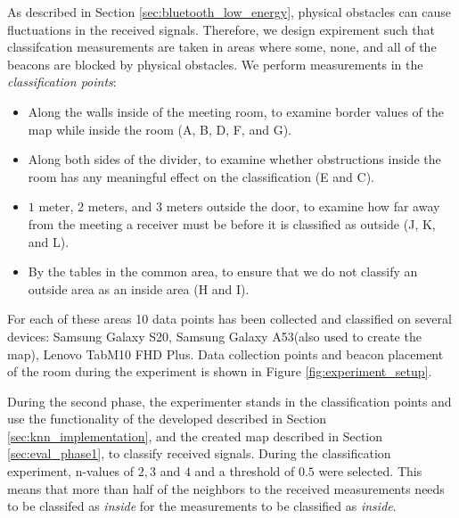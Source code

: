 As described in Section \ref{sec:bluetooth_low_energy}, physical obstacles can cause fluctuations in the received signals. 
Therefore, we design expirement such that classifcation measurements are taken in areas where some, none, and all of the beacons are blocked by physical obstacles. 
We perform measurements in the \textit{classification points}:
\begin{itemize}
    \item Along the walls inside of the meeting room, to examine border values of the map while inside the room (A, B, D, F, and G).
    \item Along both sides of the divider, to examine whether obstructions inside the room has any meaningful effect on the classification (E and C).
    \item $1$ meter, $2$ meters, and $3$ meters outside the door, to examine how far away from the meeting a receiver must be before it is classified as outside (J, K, and L).
    \item By the tables in the common area, to ensure that we do not classify an outside area as an inside area (H and I).
\end{itemize}
For each of these areas 10 data points has been collected and classified on several devices: Samsung Galaxy S20, Samsung Galaxy A53(also used to create the map), Lenovo TabM10 FHD Plus.
Data collection points and beacon placement of the room during the experiment is shown in Figure \ref{fig:experiment_setup}. 

During the second phase, the experimenter stands in the classification points and use the functionality of the developed described in Section \ref{sec:knn_implementation}, and the created map described in Section \ref{sec:eval_phase1}, to classify received signals. 
During the classification experiment, n-values of $2,3$ and $4$ and a threshold of $0.5$ were selected. 
This means that more than half of the neighbors to the received measurements needs to be classifed as \textit{inside} for the measurements to be classified as \textit{inside}.

